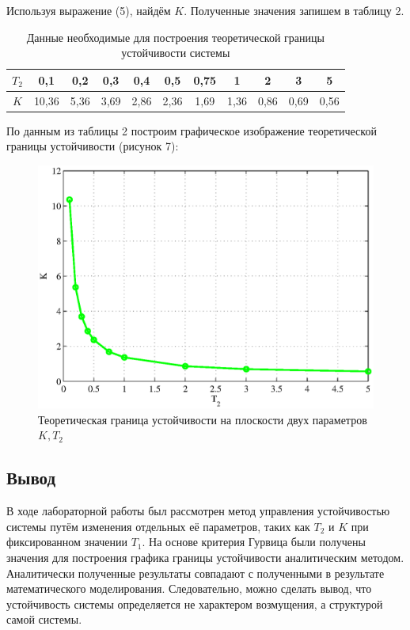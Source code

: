 \documentclass[a4paper,12pt]{article} %
\begin{document}
Используя выражение (5), найдём $K$. Полученные значения запишем в таблицу 2.
\begin{table}[h!]
    \renewcommand{\arraystretch}{1.8} %
	\centering
	\begin{threeparttable}
	\caption{Данные необходимые для построения теоретической границы устойчивости системы}
		\begin{tabular}{|c|c|c|c|c|c|c|c|c|c|c|}
			\hline $T_2$ & 0,1 & 0,2 & 0,3 & 0,4 & 0,5 & 0,75 & 1 & 2 & 3 & 5\\
			\hline $K$ & 10,36 & 5,36 & 3,69 & 2,86 & 2,36 & 1,69 & 1,36 & 0,86 & 0,69 & 0,56\\
			\hline
		\end{tabular}	
	\end{threeparttable}
\end{table}  
 
По данным из таблицы 2 построим графическое изображение теоретической границы устойчивости (рисунок 7):
\begin{figure}[H]
	\centering
	\includegraphics[width=1\linewidth]{scheme/plot4.eps}
	\caption{Теоретическая граница устойчивости на плоскости двух параметров $K, T_2$}
\end{figure}

\newpage
\begin{center}
	\section*{Вывод}
\end{center}
\par
В ходе лабораторной работы был рассмотрен метод управления устойчивостью системы путём изменения отдельных её параметров, таких как  $T_2$ и $K$ при фиксированном значении $T_1$. На основе критерия Гурвица были получены значения для построения графика границы устойчивости аналитическим методом. Аналитически полученные результаты совпадают с полученными в результате математического моделирования. Следовательно, можно сделать вывод, что устойчивость системы определяется не характером возмущения, а структурой самой системы.
\end{document}
